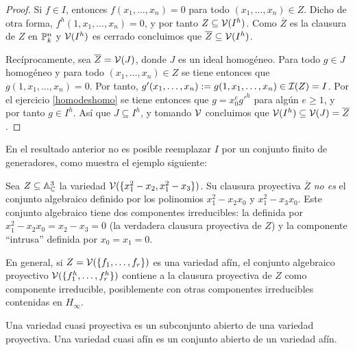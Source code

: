 \documentclass[ACGA.tex]{subfiles}
\begin{document}
\begin{proof}
 Si $f\in I$, entonces $f(x_1,\ldots,x_n)=0$ para todo $(x_1,\ldots,x_n)\in Z$. Dicho de otra forma, $f^h(1,x_1,\ldots,x_n)=0$, y por tanto $Z\subseteq\mathcal{V}(I^h)$. Como $\overline Z$ es la clausura de $Z$ en $\mathbb{P}^n_k$ y $\mathcal{V}(I^h)$ es cerrado concluimos que $\overline Z\subseteq\mathcal{V}(I^h)$. 

Recíprocamente, sea $\overline Z=\mathcal{V}(J)$, donde $J$ es un ideal homogéneo. Para todo $g\in J$ homogéneo y para todo $(x_1,\ldots,x_n)\in Z$ se tiene entonces que $g(1,x_1,\ldots,x_n)=0$. Por tanto, $g'(x_1,\ldots,x_n):=g(1,x_1,\ldots,x_n)\in\mathcal{I}(Z)=I$. Por el ejercicio \ref{homodeshomo} se tiene entonces que $g=x_0^eg'^h$ para algún $e\geq 1$, y por tanto $g\in I^h$. Así que $J\subseteq I^h$, y tomando $\mathcal{V}$ concluimos que $\mathcal{V}(I^h)\subseteq\mathcal{V}(J)=\overline Z$.
\end{proof}

En el resultado anterior no es posible reemplazar $I$ por un conjunto finito de generadores, como muestra el ejemplo siguiente:

\begin{ejs}
 Sea $Z\subseteq\mathbb{A}^3_{\mathbb{C}}$ la variedad $\mathcal{V}(\{x_1^2-x_2,x_1^2-x_3\})$. Su clausura proyectiva $\overline Z$ {\it no es} el conjunto algebraico definido por los polinomios $x_1^2-x_2x_0$ y $x_1^2-x_3x_0$. Este conjunto algebraico tiene dos componentes irreducibles: la definida por $x_1^2-x_2x_0=x_2-x_3=0$ (la verdadera clausura proyectiva de $Z$) y la componente ``intrusa'' definida por $x_0=x_1=0$.
\end{ejs}

En general, si $Z=\mathcal{V}(\{f_1,\ldots,f_r\})$ es una variedad afín, el conjunto algebraico proyectivo $\mathcal{V}(\{f_1^h,\ldots,f_r^h\})$ contiene a la clausura proyectiva de $Z$ como componente irreducible, posiblemente con otras componentes irreducibles contenidas en $H_\infty$.













\begin{defi} Una variedad cuasi proyectiva es un subconjunto abierto de una variedad proyectiva. Una variedad cuasi afín es un conjunto abierto de un variedad afín.
\end{defi}
\end{document}
